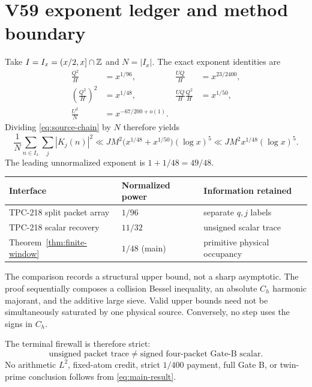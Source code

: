 \section{V59 exponent ledger and method boundary}

Take $I=I_x=(x/2,x]\cap\mathbb Z$ and $N=|I_x|$.  The exact exponent identities are
\begin{align}
 \frac{Q^2}{H}&=x^{1/96}, &
 \frac{UQ}{H}&=x^{23/2400},\label{eq:factor-exponents}\\
 \left(\frac{Q^2}{H}\right)^2&=x^{1/48}, &
 \frac{UQ}{H}\frac{Q^2}{H}&=x^{1/50},\label{eq:product-exponents}\\
 \frac{U^2}{N}&=x^{-67/200+o(1)}.                     \label{eq:window-exponent}
\end{align}
Dividing \eqref{eq:source-chain} by $N$ therefore yields
\begin{equation}
 \frac1N\sum_{n\in I_x}\sum_j|K_j(n)|^2
 \ll JM^2\bigl(x^{1/48}+x^{1/50}\bigr)(\log x)^5
 \ll JM^2x^{1/48}(\log x)^5.                         \label{eq:main-result}
\end{equation}
The leading unnormalized exponent is $1+1/48=49/48$.

\begin{center}
\begin{tabular}{lll}
\toprule
Interface & Normalized power & Information retained \\
\midrule
TPC-218 split packet array & $1/96$ & separate $q,j$ labels \\
TPC-218 scalar recovery & $11/32$ & unsigned scalar trace \\
Theorem~\ref{thm:finite-window} & $1/48$ (main) & primitive physical occupancy \\
\bottomrule
\end{tabular}
\end{center}

The comparison records a structural upper bound, not a sharp asymptotic.  The proof
sequentially composes a collision Bessel inequality, an absolute $C_h$ harmonic
majorant, and the additive large sieve.  Valid upper bounds need not be simultaneously
saturated by one physical source.  Conversely, no step uses the signs in $C_h$.

The terminal firewall is therefore strict:
\[
 \text{unsigned packet trace}
 \ne \text{signed four-packet Gate-B scalar}.
\]
No arithmetic $L^2$, fixed-atom credit, strict $1/400$ payment, full Gate B, or
twin-prime conclusion follows from \eqref{eq:main-result}.
